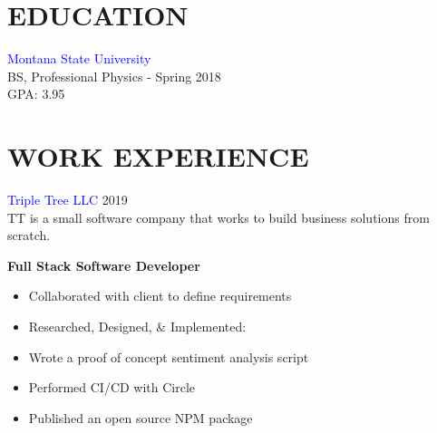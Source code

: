 \documentclass[12pt]{resume}
\begin{document}
    \begin{minipage}[t]{0.48\textwidth}

        {\section* {EDUCATION}}
        \textcolor{blue}{Montana State University} \\
        BS, Professional Physics - Spring 2018\\
        GPA: 3.95

        {\section* {WORK EXPERIENCE}}
        \textcolor{blue}{Triple Tree LLC} {\hfill 2019} \\
        TT is a small software company that works to build business
        solutions from scratch.
        \begin{spacing}{1.2}
            {\bf Full Stack Software Developer}
        \end{spacing}
        \vspace{-.5mm}
        \begin{itemize}
            \setlength\itemsep{.2em}
            \item {Collaborated with client to define requirements}
            \item {Researched, Designed, \& Implemented:}
            \item {Wrote a proof of concept sentiment analysis script}
            \item {Performed CI/CD with Circle}
            \item {Published an open source NPM package}
        \end{itemize}

        \vspace{1em}


\end{minipage}
\end{document}
